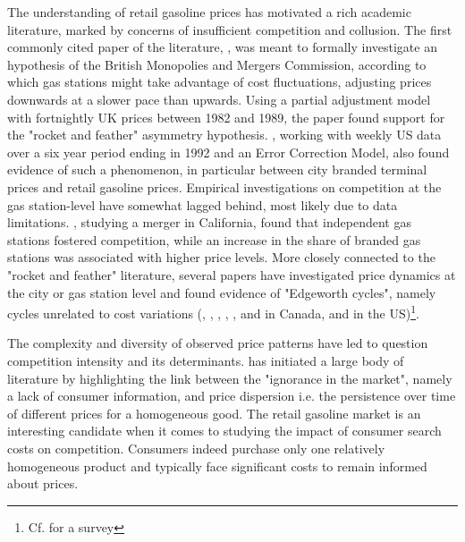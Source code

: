 \documentclass[english]{article}
\begin{document}
The understanding of retail gasoline prices has motivated a rich academic literature, marked by concerns of insufficient competition and collusion. The first commonly cited paper of the literature, \cite{BAC91}, was meant to formally investigate an hypothesis of the British Monopolies and Mergers Commission, according to which gas stations might take advantage of cost fluctuations, adjusting prices downwards at a slower pace than upwards. Using a partial adjustment model with fortnightly UK prices between 1982 and 1989, the paper found support for the "rocket and feather" asymmetry hypothesis. \cite{BOR97}, working with weekly US data over a six year period ending in 1992 and an Error Correction Model, also found evidence of such a phenomenon, in particular between city branded terminal prices and retail gasoline prices. Empirical investigations on competition at the gas station-level have somewhat lagged behind, most likely due to data limitations. \cite{HAS04}, studying a merger in California, found that independent gas stations fostered competition, while an increase in the share of branded gas stations was associated with higher price levels. More closely connected to the "rocket and feather" literature, several papers have investigated price dynamics at the city or gas station level and found evidence of "Edgeworth cycles", namely cycles unrelated to cost variations (\cite{ECK02}, \cite{ECK03}, \cite{ECK04a}, \cite{ECK04b}, \cite{NOE07a}, \cite{NOE07b} and \cite{NOE08} in Canada, \cite{LEW09} and \cite{LEW11a} in the US)\footnote{Cf. \cite{ECK13} for a survey}.

The complexity and diversity of observed price patterns have led to question competition intensity and its determinants. \cite{STI61} has initiated a large body of literature by highlighting the link between the "ignorance in the market", namely a lack of consumer information, and price dispersion i.e. the persistence over time of different prices for a homogeneous good. The retail gasoline market is an interesting candidate when it comes to studying the impact of consumer search costs on competition. Consumers indeed purchase only one relatively homogeneous product and typically face significant costs to remain informed about prices.
\end{document}
